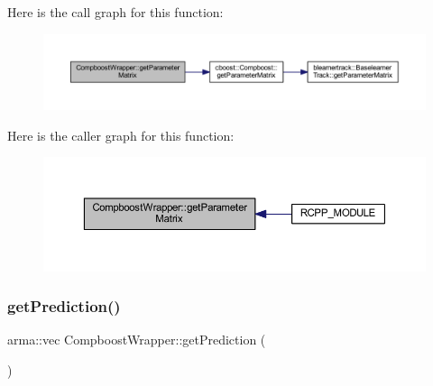 Here is the call graph for this function\+:\nopagebreak
\begin{figure}[H]
\begin{center}
\leavevmode
\includegraphics[width=350pt]{class_compboost_wrapper_a1ffa4829c1c8ce639049271f44823f94_cgraph}
\end{center}
\end{figure}
Here is the caller graph for this function\+:\nopagebreak
\begin{figure}[H]
\begin{center}
\leavevmode
\includegraphics[width=350pt]{class_compboost_wrapper_a1ffa4829c1c8ce639049271f44823f94_icgraph}
\end{center}
\end{figure}
\mbox{\label{class_compboost_wrapper_ad0340d006f55b3278b670363ad90d545}} 
\subsubsection{\texorpdfstring{get\+Prediction()}{getPrediction()}}
{\footnotesize\ttfamily arma\+::vec Compboost\+Wrapper\+::get\+Prediction (\begin{DoxyParamCaption}{ }\end{DoxyParamCaption})\hspace{0.3cm}{\ttfamily [inline]}}

